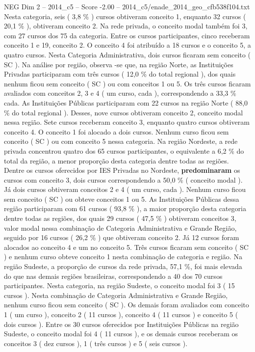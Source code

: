 \begin{textsample}{NEG Dim 2 – 2014\_c5 – Score -2.00 – 2014\_c5/enade\_2014\_geo\_cfb538f104.txt}
Nesta categoria, seis ( 3,8 \% ) cursos obtiveram conceito 1, enquanto 32 cursos ( 20,1 \% ), obtiveram conceito 2.
Na rede privada, o conceito modal também foi 3, com 27 cursos dos 75 da categoria.
Entre os cursos participantes, cinco receberam conceito 1 e 19, conceito 2.
O conceito 4 foi atribuído a 18 cursos e o conceito 5, a quatro cursos.
Nesta Categoria Administrativa, dois cursos ficaram sem conceito ( SC ).
Na análise por região, observa -se que, na região Norte, as Instituições Privadas participaram com três cursos ( 12,0 \% do total regional ), dos quais nenhum ficou sem conceito ( SC ) ou com conceitos 1 ou 5.
Os três cursos ficaram avaliados com conceitos 2, 3 e 4 ( um curso, cada ), correspondendo a 33,3 \% cada.
As Instituições Públicas participaram com 22 cursos na região Norte ( 88,0 \% do total regional ).
Desses, nove cursos obtiveram conceito 2, conceito modal nessa região.
Sete cursos receberam conceito 3, enquanto quatro cursos obtiveram conceito 4.
O conceito 1 foi alocado a dois cursos.
Nenhum curso ficou sem conceito ( SC ) ou com conceito 5 nessa categoria.
Na região Nordeste, a rede privada concentrou quatro dos 65 cursos participantes, o equivalente a 6,2 \% do total da região, a menor proporção desta categoria dentre todas as regiões.
Dentre os cursos oferecidos por IES Privadas no Nordeste, \textbf{predominaram} os cursos com conceito 3, dois cursos correspondendo a 50,0 \% ( conceito modal ).
Já dois cursos obtiveram conceitos 2 e 4 ( um curso, cada ).
Nenhum curso ficou sem conceito ( SC ) ou obteve conceitos 1 ou 5.
As Instituições Públicas dessa região participaram com 61 cursos ( 93,8 \% ), a maior proporção desta categoria dentre todas as regiões, dos quais 29 cursos ( 47,5 \% ) obtiveram conceitos 3, valor modal nessa combinação de Categoria Administrativa e Grande Região, seguido por 16 cursos ( 26,2 \% ) que obtiveram conceito 2.
Já 12 cursos foram alocados ao conceito 4 e um no conceito 5.
Três cursos ficaram sem conceito ( SC ) e nenhum curso obteve conceito 1 nesta combinação de categoria e região.
Na região Sudeste, a proporção de cursos da rede privada, 57,1 \%, foi mais elevada do que nas demais regiões brasileiras, correspondendo a 40 dos 70 cursos participantes.
Nesta categoria, na região Sudeste, o conceito modal foi 3 ( 15 cursos ).
Nesta combinação de Categoria Administrativa e Grande Região, nenhum curso ficou sem conceito ( SC ).
Os demais foram avaliados com conceito 1 ( um curso ), conceito 2 ( 11 cursos ), conceito 4 ( 11 cursos ) e conceito 5 ( dois cursos ).
Entre os 30 cursos oferecidos por Instituições Públicas na região Sudeste, o conceito modal foi 4 ( 11 cursos ), e os demais cursos receberam os conceitos 3 ( dez cursos ), 1 ( três cursos ) e 5 ( seis cursos ).

\end{textsample}
